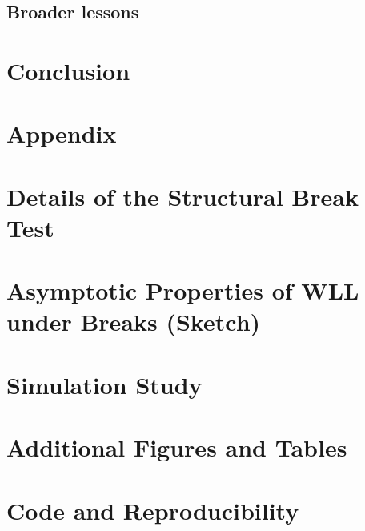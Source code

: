 \documentclass[11pt]{article}
\newcommand{\1}{\mathbf{1}}
\begin{document}
\subsection{Broader lessons}

\section{Conclusion}
\label{sec:conclusion}


\appendix

\section*{Appendix}

\section{Details of the Structural Break Test}

\section{Asymptotic Properties of WLL under Breaks (Sketch)}

\section{Simulation Study}

\section{Additional Figures and Tables}

\section{Code and Reproducibility}



\end{document}
